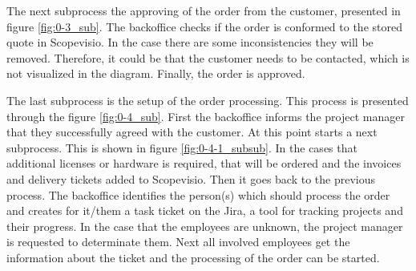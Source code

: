 The next subprocess the approving of the order from the customer, presented in figure \ref{fig:0-3_sub}. The backoffice checks if the order is conformed to the stored quote in Scopevisio. In the case there are some inconsistencies they will be removed. Therefore, it could be that the customer needs to be contacted, which is not visualized in the diagram. Finally, the order is approved.

The last subprocess is the setup of the order processing. This process is presented through the figure \ref{fig:0-4_sub}. First the backoffice informs the project manager that they successfully agreed with the customer. At this point starts a next subprocess. This is shown in figure \ref{fig:0-4-1_subsub}. In the cases that additional licenses or hardware is required, that will be ordered and the invoices and delivery tickets added to Scopevisio. Then it goes back to the previous process. \newline
The backoffice identifies the person(s) which should process the order and creates for it/them a task ticket on the Jira, a tool for tracking projects and their progress. In the case that the employees are unknown, the project manager is requested to determinate them. Next all involved employees get the information about the ticket and the processing of the order can be started.

